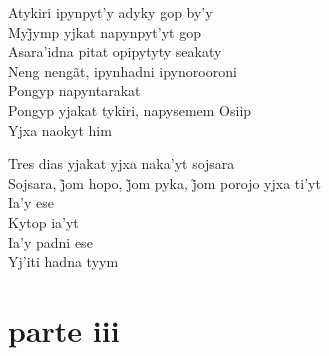  \smallskip
 \begin{center}\end{center}
 \smallskip
 
\noindent   Atykiri ipynpyt'y adyky gop by'y\\
  Myj̃ymp yjkat napynpyt’yt gop\\
  Asara'idna pitat opipytyty seakaty\\
  Neng nengãt, ipynhadni ipynorooroni\\
  Pongyp napyntarakat\\
  Pongyp yjakat tykiri, napysemem Osiip\\
  Yjxa naokyt him
 
 \smallskip
 \begin{center}\end{center}
 \smallskip
 
\noindent   Tres dias yjakat yjxa naka'yt sojsara\\
  Sojsara, j̃om hopo, j̃om pyka, j̃om porojo yjxa ti’yt\\
  Ia'y ese\\
  Kytop ia'yt\\
  Ia'y padni ese\\
  Yj'iti hadna tyym
 
 
\medskip
\section{parte iii}

